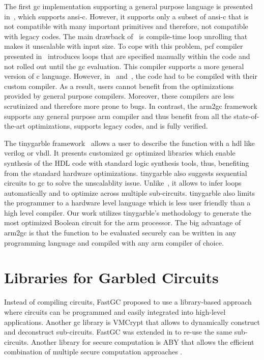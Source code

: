 The first \acrshort{gc} implementation supporting a general purpose language is presented in~\cite{holzer2012secure}, which supports \acrshort{ansi}-\gls{c}.
However, it supports only a subset of \acrshort{ansi}-\gls{c} that is not compatible with many important primitives and therefore, not compatible with legacy codes.
The main drawback of~\cite{holzer2012secure} is compile-time loop unrolling that makes it unscalable with input size.
To cope with this problem, \gls{pcf} compiler presented in~\cite{kreuter2013pcf} introduces loops that are specified manually within the code and not rolled out until the \acrshort{gc} evaluation.
This compiler supports a more general version of \gls{c} language.
However, in~\cite{holzer2012secure} and~\cite{kreuter2013pcf}, the code had to be compiled with their custom compiler.
As a result, users cannot benefit from the optimizations provided by general purpose compilers.
Moreover, these compilers are less scrutinized and therefore more prone to bugs.
In contrast, the \gls{arm2gc} framework supports any general purpose \gls{arm} compiler and thus benefit from all the state-of-the-art optimizations, supports legacy codes, and is fully verified.

The \gls{tinygarble} framework~\cite{songhori2015tinygarble} allows a user to describe the function with a \acrfull{hdl} like \gls{verilog} or \gls{vhdl}.
It presents customized \acrshort{gc} optimized libraries which enable synthesis of the HDL code with standard logic synthesis tools, thus, benefiting from the standard hardware optimizations.
\gls{tinygarble} also suggests sequential circuits to \acrshort{gc} to solve the unscalablity issue.
Unlike~\cite{kreuter2013pcf}, it allows to infer loops automatically and to optimize across multiple sub-circuits.
\gls{tinygarble} also limits the programmer to a hardware level language which is less user friendly than a high level compiler.
Our work utilizes \gls{tinygarble}'s methodology to generate the most optimized Boolean circuit for the \gls{arm} processor.
The big advantage of \gls{arm2gc} is that the function to be evaluated securely can be written in any programming language and compiled with any \gls{arm} compiler of choice.

\section{Libraries for Garbled Circuits}\label{sec:related-library}
Instead of compiling circuits, FastGC \cite{huang2011faster} proposed to use a library-based approach where circuits can be programmed and easily integrated into high-level applications.
Another \acrshort{gc} library is VMCrypt \cite{malka2011vmcrypt} that allows to dynamically construct and deconstruct sub-circuits.
FastGC was extended in \cite{henecka2013faster} to re-use the same sub-circuits.
Another library for secure computation is ABY that allows the efficient combination of multiple secure computation approaches \cite{demmler2015aby}.

